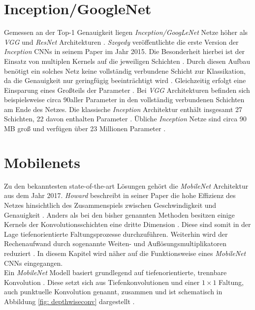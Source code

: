 		\section*{Inception/GoogleNet}
		\label{subsec: inception}
		Gemessen an der Top-1 Genauigkeit liegen \textit{Inception/GoogLeNet} Netze höher als \textit{VGG} und \textit{ResNet} Architekturen \cite{cnnvergleich}. \textit{Szegedy} veröffentlichte die erste Version der \textit{Inception} CNNs in seinem Paper \cite{inception} im Jahr 2015. Die Besonderheit hierbei ist der Einsatz von multiplen Kernels auf die jeweiligen Schichten \cite{inception}. Durch diesen Aufbau benötigt ein solches Netz keine vollständig verbundene Schicht zur Klassikation, da die Genauigkeit nur geringfügig beeinträchtigt wird \cite{inception}. Gleichzeitig erfolgt eine Einsparung eines Großteils der Parameter \cite{inception}. Bei \textit{VGG} Architekturen befinden sich beispielsweise circa 90\percent\text{ }aller Parameter in den vollständig verbundenen Schichten am Ende des Netzes. Die klassische \textit{Inception} Architektur enthält insgesamt 27 Schichten, 22 davon enthalten Parameter \cite{inception}. Übliche \textit{Inception} Netze sind circa 90 MB groß und verfügen über 23 Millionen Parameter \cite{keras}.\\ 
		

		
		\section*{Mobilenets}
		\label{subsec: mobilenets}
		Zu den bekanntesten state-of-the-art Lösungen gehört die \textit{MobileNet} Architektur aus dem Jahr 2017. \textit{Howard} beschreibt in seiner Paper die hohe Effizienz des Netzes hinsichtlich des Zusammenspiels zwischen Geschwindigkeit und Genauigkeit \cite{mobilenets}. Anders als bei den bisher genannten Methoden besitzen einige Kernels der Konvolutionsschichten eine dritte Dimension \cite{mobilenets}. Diese sind somit in der Lage tiefenorientierte Faltungsprozesse durchzuführen. Weiterhin wird der Rechenaufwand durch sogenannte Weiten- und Auflösungsmultiplikatoren reduziert \cite{mobilenets}. In diesem Kapitel wird näher auf die Funktionsweise eines \textit{MobileNet} CNNs eingegangen.\\
		
		Ein \textit{MobileNet} Modell basiert grundlegend auf tiefenorientierte, trennbare Konvolution \cite{mobilenets}. Diese setzt sich aus Tiefenkonvolutionen und einer $1\times1$ Faltung, auch punktuelle Konvolution genannt, zusammen und ist schematisch in Abbildung \ref{fig: depthwiseconv} dargestellt \cite{mobilenets}.\\
		
